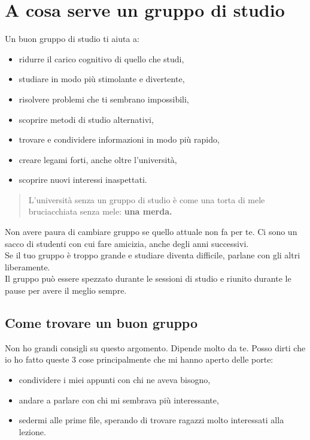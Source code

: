 \documentclass{article}
\begin{document}
\section{A cosa serve un gruppo di studio}
Un buon gruppo di studio ti aiuta a:
\begin{itemize}
\item ridurre il carico cognitivo di quello che studi,
\item studiare in modo più stimolante e divertente,
\item risolvere problemi che ti sembrano impossibili,
\item scoprire metodi di studio alternativi,
\item trovare e condividere informazioni in modo più rapido,
\item creare legami forti, anche oltre l'università,
\item scoprire nuovi interessi inaspettati.
\end{itemize}
\begin{quote}
L'università senza un gruppo di studio è come una torta di mele bruciacchiata senza mele: \textbf{una merda.}
\end{quote}
Non avere paura di cambiare gruppo se quello attuale non fa per te. Ci sono un sacco di studenti con cui fare amicizia, anche degli anni successivi.\\
Se il tuo gruppo è troppo grande e studiare diventa difficile, parlane con gli altri liberamente.\\
Il gruppo può essere spezzato durante le sessioni di studio e riunito durante le pause per avere il meglio sempre.


\subsection{Come trovare un buon gruppo}
Non ho grandi consigli su questo argomento. Dipende molto da te.
Posso dirti che io ho fatto queste 3 cose principalmente che mi hanno aperto delle porte:
\begin{itemize}
\item condividere i miei appunti con chi ne aveva bisogno, 
\item andare a parlare con chi mi sembrava più interessante,
\item sedermi alle prime file, sperando di trovare ragazzi molto interessati alla lezione.
\end{itemize}
\end{document}
